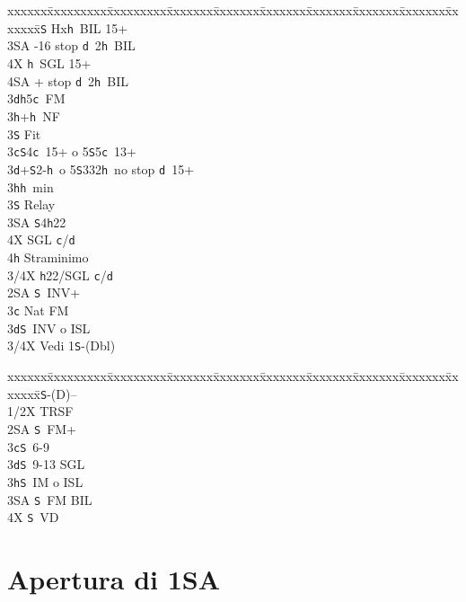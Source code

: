 \documentclass[a4paper,italian]{article}
\newcommand{\BS}{\small{\texttt{S}}}
\newcommand{\BC}{\small{\texttt{c}}}
\newcommand{\BD}{\small{\texttt{d}}}
\newcommand{\BH}{\small{\texttt{h}}}
\newenvironment{bidtable}
{\begin{tabbing}

    xxxxxx\=xxxxxxxxx\=xxxxxxxxx\=xxxxxxx\=xxxxxxx\=xxxxxxx\=xxxxxxx\=xxxxxxx\=xxxxxxx\=xxxxxxx\=\kill}
{\end{tabbing} }%
\begin{document}
\begin{multicols}{2}
\begin{bidtable}
        3\BS \> Hx\BH\ BIL 15+\\
        3\small{SA} -16 stop \BD\ 2\BH\ BIL\\
        4X \BH\ SGL 15+\\
        4\small{SA} + stop \BD\ 2\BH\ BIL\-\\
        3\BD {}\BH 5\BC\ FM\\
        3\BH {}+\BH\ NF\\
        3\BS \> Fit\-\\
        3\BC {}\BS 4\BC\ 15+ o 5\BS 5\BC\ 13+\\
        3\BD {}+\BS2-\BH\ o 5\BS 332\BH\ no stop \BD\ 15+\\
        3\BH {}\BH\ min\+\\
        3\BS \> Relay\+\\
        3\small{SA} \BS 4\BH 22\\
        4X \> SGL \BC /\BD \\
        4\BH \> Straminimo\-\-\\
        3/4X \BH 22/SGL \BC /\BD \-\\
        2\small{SA} \BS\ INV+\\
        3\BC\> Nat FM\\
        3\BD{}\BS\ INV o ISL\\
        3/4X \> Vedi 1\BS -(Dbl)\-
    \end{bidtable}
    \columnbreak
    \begin{bidtable}
        1\BS-(D)--\+\\
        1/2X \> TRSF\\
        2\small{SA} \BS\ FM+\\
        3\BC {}\BS\ 6-9\\
        3\BD {}\BS\ 9-13 SGL\\
        3\BH {}\BS\ IM o ISL\\
        3\small{SA} \BS\ FM BIL\\
        4X \BS\ VD\-
    \end{bidtable}
    \vfill\null
\end{multicols}

\newpage

\section{Apertura di 1SA}
\end{document}
